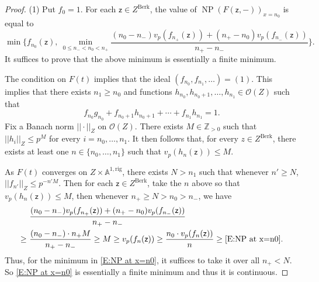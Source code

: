 \documentclass[12pt]{amsart}
\theoremstyle{definition}
\numberwithin{equation}{subsection}
\def\calO{\mathcal{O}}
\def\AAA{\mathbb{A}}
\def\ZZ{\mathbb{Z}}
\def\sfz{\mathsf{z}}
\DeclareMathOperator{\NP}{NP}
\newcommand{\Berk}{\mathrm{Berk}}
\newcommand{\rig}{\mathrm{rig}}
\begin{document}
\begin{proof}
(1) Put $f_0=1$. For each $\sfz \in Z^\Berk$, the value of $\NP(F(\sfz,-))_{x=n_0}$ is equal to
\begin{equation}
\label{E:NP at x=n0}
\min\bigg\{ f_{n_0}(\sfz), \ 
\min_{0 \leq n_-< n_0 < n_+} \frac { (n_0-n_-)v_p(f_{n_+}(\sfz)) + (n_+-n_0) v_p(f_{n_-}(\sfz))}{n_+-n_-} \bigg\}.
\end{equation}
It suffices to prove that the above minimum is essentially a finite minimum.

The condition on $F(t)$ implies that the ideal $(f_{n_0}, f_{n_1}, \dots) = (1)$. This implies that there exists $n_1 \geq n_0$ and functions $h_{n_0}, h_{n_0+1},\dots, h_{n_1} \in \calO(Z)$ such that
$$
f_{n_0}g_{n_0}+f_{n_0+1}h_{n_0+1} + \cdots + f_{n_1}h_{n_1} =1.
$$
Fix a Banach norm $||\cdot ||_Z$ on $\calO(Z)$.
There exists $M \in \ZZ_{>0}$ such that $||h_i||_{Z} \leq p^M$ for every $i = n_0, \dots, n_1$. It then follows that, for every $z \in Z^\Berk$, there exists at least one $n \in \{n_0, \dots, n_1\}$ such that $v_p(h_n(\sfz)) \leq M$.

As $F(t)$ converges on $Z \times \AAA^{1,\rig}$, there exists $N > n_1$ such that whenever $n' \geq N$, $||f_{n'}||_Z \leq p^{-n'M}$. Then for each $\sfz \in Z^\Berk$, take the $n$ above so that $v_p(h_n(\sfz)) \leq M$, then whenever $n_+ \geq N > n_0 > n_-$, we have
\begin{align*}
&\frac { (n_0-n_-)v_p(f_{n_+}(\sfz)) + (n_+-n_0) v_p(f_{n_-}(\sfz))}{n_+-n_-}
\\
\geq\ & \frac{(n_0-n_-)\cdot n_+ M}{n_+-n_-} \geq M \geq v_p(f_n(\sfz)) \geq 
\frac{n_0\cdot v_p(f_n(\sfz))}{n} \geq \eqref{E:NP at x=n0}.
\end{align*}
Thus, for the minimum in \eqref{E:NP at x=n0}, it suffices to take it over all $n_+<N$. So \eqref{E:NP at x=n0} is essentially a finite minimum and thus it is continuous.
\end{proof}
\end{document}
